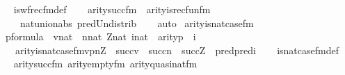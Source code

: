 \begin{isabellebody}
%
\isadelimproof
\ \ %
\endisadelimproof
%
\isatagproof
{}\isamarkupfalse%
\ is{\isacharunderscore}{\kern0pt}wfrec{\isacharunderscore}{\kern0pt}fm{\isacharunderscore}{\kern0pt}def\isanewline
\ \ \isamarkupfalse%
\ arity{\isacharunderscore}{\kern0pt}succ{\isacharunderscore}{\kern0pt}fm\ \ arity{\isacharunderscore}{\kern0pt}is{\isacharunderscore}{\kern0pt}recfun{\isacharunderscore}{\kern0pt}fm\ \isanewline
\ \ \ \ \ nat{\isacharunderscore}{\kern0pt}union{\isacharunderscore}{\kern0pt}abs{}\ pred{\isacharunderscore}{\kern0pt}Un{\isacharunderscore}{\kern0pt}distrib\isanewline
\ \ \isamarkupfalse%
\ auto%
\endisatagproof
{\isafoldproof}%
%
\isadelimproof
\isanewline
%
\endisadelimproof
\isanewline
{}\isamarkupfalse%
\ arity{\isacharunderscore}{\kern0pt}is{\isacharunderscore}{\kern0pt}nat{\isacharunderscore}{\kern0pt}case{\isacharunderscore}{\kern0pt}fm\ {\isacharcolon}{\kern0pt}\isanewline
\ \ {\isachardoublequoteopen}{\isasymlbrakk}p{\isasymin}formula\ {\isacharsemicolon}{\kern0pt}\ v{\isasymin}nat\ {\isacharsemicolon}{\kern0pt}\ n{\isasymin}nat{\isacharsemicolon}{\kern0pt}\ Z{\isasymin}nat{\isacharsemicolon}{\kern0pt}\ i{\isasymin}nat{\isasymrbrakk}\ {\isasymLongrightarrow}\ arity{\isacharparenleft}{\kern0pt}p{\isacharparenright}{\kern0pt}\ {\isacharequal}{\kern0pt}\ i\ {\isasymLongrightarrow}\ \isanewline
\ \ \ \ arity{\isacharparenleft}{\kern0pt}is{\isacharunderscore}{\kern0pt}nat{\isacharunderscore}{\kern0pt}case{\isacharunderscore}{\kern0pt}fm{\isacharparenleft}{\kern0pt}v{\isacharcomma}{\kern0pt}p{\isacharcomma}{\kern0pt}n{\isacharcomma}{\kern0pt}Z{\isacharparenright}{\kern0pt}{\isacharparenright}{\kern0pt}\ {\isacharequal}{\kern0pt}\ succ{\isacharparenleft}{\kern0pt}v{\isacharparenright}{\kern0pt}\ {\isasymunion}\ succ{\isacharparenleft}{\kern0pt}n{\isacharparenright}{\kern0pt}\ {\isasymunion}\ succ{\isacharparenleft}{\kern0pt}Z{\isacharparenright}{\kern0pt}\ {\isasymunion}\ pred{\isacharparenleft}{\kern0pt}pred{\isacharparenleft}{\kern0pt}i{\isacharparenright}{\kern0pt}{\isacharparenright}{\kern0pt}{\isachardoublequoteclose}\isanewline
%
\isadelimproof
\ \ %
\endisadelimproof
%
\isatagproof
{}\isamarkupfalse%
\ is{\isacharunderscore}{\kern0pt}nat{\isacharunderscore}{\kern0pt}case{\isacharunderscore}{\kern0pt}fm{\isacharunderscore}{\kern0pt}def\isanewline
\ \ \isamarkupfalse%
\ arity{\isacharunderscore}{\kern0pt}succ{\isacharunderscore}{\kern0pt}fm\ arity{\isacharunderscore}{\kern0pt}empty{\isacharunderscore}{\kern0pt}fm\ arity{\isacharunderscore}{\kern0pt}quasinat{\isacharunderscore}{\kern0pt}fm\ \isanewline

\end{isabellebody}
